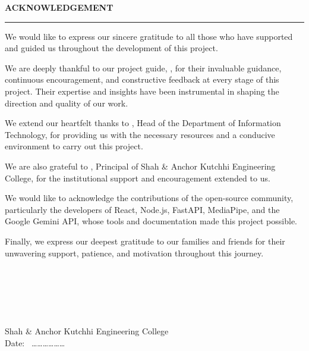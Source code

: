 \thispagestyle{empty}

\begin{center}
{\Large {\bf \uppercase{Acknowledgement}}}
\end{center}

\vspace{\baselineskip}
\hrule
\vspace{2\baselineskip}

\noindent
We would like to express our sincere gratitude to all those who have supported and guided us throughout the development of this project.

\vspace{\baselineskip}
\noindent
We are deeply thankful to our project guide, \textbf{\mysupervisor}, for their invaluable guidance, continuous encouragement, and constructive feedback at every stage of this project. Their expertise and insights have been instrumental in shaping the direction and quality of our work.

\vspace{\baselineskip}
\noindent
We extend our heartfelt thanks to \textbf{\HoDName}, Head of the Department of Information Technology, for providing us with the necessary resources and a conducive environment to carry out this project.

\vspace{\baselineskip}
\noindent
We are also grateful to \textbf{\principalName}, Principal of Shah \& Anchor Kutchhi Engineering College, for the institutional support and encouragement extended to us.

\vspace{\baselineskip}
\noindent
We would like to acknowledge the contributions of the open-source community, particularly the developers of React, Node.js, FastAPI, MediaPipe, and the Google Gemini API, whose tools and documentation made this project possible.

\vspace{\baselineskip}
\noindent
Finally, we express our deepest gratitude to our families and friends for their unwavering support, patience, and motivation throughout this journey.

\bigskip
\bigskip

\noindent
\vspace{\baselineskip} \\
\textbf{\studentNamea} \\
\textbf{\studentNameb} \\
\textbf{\studentNamec} \\
\textbf{\studentNamed} \\
Shah \& Anchor Kutchhi Engineering College \\
Date: \ ………………
